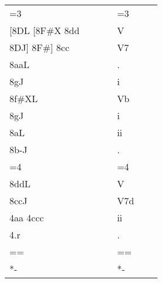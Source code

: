 \begin{tabular}{lllll}
=3                            & $\quad \quad$ & =3           \\
{[}8DL {[}8F\#X 8dd           & $\quad \quad$ & V            \\
8DJ{]} 8F\#{]} 8cc            & $\quad \quad$ & V7           \\
8aaL                          & $\quad \quad$ & .            \\
8gJ                           & $\quad \quad$ & i            \\
8f\#XL                        & $\quad \quad$ & Vb           \\
8gJ                           & $\quad \quad$ & i            \\
8aL                           & $\quad \quad$ & ii           \\
8b-J                          & $\quad \quad$ & .            \\
=4                            & $\quad \quad$ & =4           \\
8ddL                          & $\quad \quad$ & V            \\
8ccJ                          & $\quad \quad$ & V7d          \\
4aa 4ccc                      & $\quad \quad$ & ii           \\
4.r                           & $\quad \quad$ & .            \\
==                            & $\quad \quad$ & ==           \\
*-                            & $\quad \quad$ & *-          
\end{tabular}
